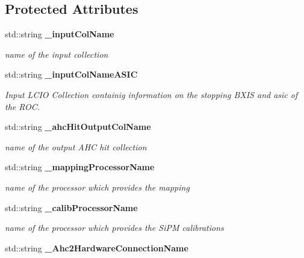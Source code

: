 \subsection*{Protected Attributes}
\begin{DoxyCompactItemize}
\item 
std\-::string {\bf \-\_\-input\-Col\-Name}\label{classCALICE_1_1Ahc2CalibrateProcessor_af40da80c07919fd7ff11c2eea1aeb381}

\begin{DoxyCompactList}\small\item\em name of the input collection \end{DoxyCompactList}\item 
std\-::string {\bf \-\_\-input\-Col\-Name\-A\-S\-I\-C}\label{classCALICE_1_1Ahc2CalibrateProcessor_aa80531c67c2722ad0e2460a7e0876bae}

\begin{DoxyCompactList}\small\item\em Input L\-C\-I\-O Collection containig information on the stopping B\-X\-I\-S and asic of the R\-O\-C. \end{DoxyCompactList}\item 
std\-::string {\bf \-\_\-ahc\-Hit\-Output\-Col\-Name}\label{classCALICE_1_1Ahc2CalibrateProcessor_a3dc06786436feb1670498da3fd69ad94}

\begin{DoxyCompactList}\small\item\em name of the output A\-H\-C hit collection \end{DoxyCompactList}\item 
std\-::string {\bf \-\_\-mapping\-Processor\-Name}\label{classCALICE_1_1Ahc2CalibrateProcessor_ac8d1b19a0ffa72a6ea1427664503921d}

\begin{DoxyCompactList}\small\item\em name of the processor which provides the mapping \end{DoxyCompactList}\item 
std\-::string {\bf \-\_\-calib\-Processor\-Name}\label{classCALICE_1_1Ahc2CalibrateProcessor_ae410aaaebdd65ba4054169c41266154e}

\begin{DoxyCompactList}\small\item\em name of the processor which provides the Si\-P\-M calibrations \end{DoxyCompactList}\item 
std\-::string {\bfseries \-\_\-\-Ahc2\-Hardware\-Connection\-Name}\label{classCALICE_1_1Ahc2CalibrateProcessor_a58a404a600c53c93f2a8d93cdd3d0bdd}


\end{DoxyCompactItemize}
